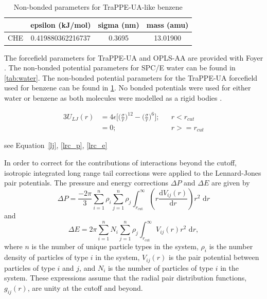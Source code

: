 \begin{table}
\caption{Non-bonded parameters for TraPPE-UA-like benzene} \label{tab:bz_nonbond}
\centering
\begin{tabular}{lccc}
    & epsilon (kJ/mol)  & sigma (nm) & mass (amu) \\ \hline
CHE & 0.419880362216737 & 0.3695     &  13.01900  \\
\end{tabular}
\end{table}

The forcefield parameters for TraPPE-UA and OPLS-AA are provided with Foyer \citep{foyer}. 
The non-bonded potential parameters for SPC/E water can be found in \autoref{tab:water}. 
The non-bonded potential parameters for the TraPPE-UA forcefield used for benzene can be found in \ref{tab:bz_nonbond}. No bonded potentials were used for either water or benzene as both molecules were modelled as a rigid bodies \citep{Nguyen2011a, Glaser2020a}. 


\begin{alignat}{3}
U_{LJ}(r) & = 4\epsilon\bigg[\bigg(\frac{\sigma}{r}\bigg)^{12} - \bigg(\frac{\sigma}{r}\bigg)^{6}\bigg]; && r<r_{cut} 
    \label{lj} \\
& = 0; && r>=r_{cut}
    \nonumber
\end{alignat}

see Equation~\eqref{lj}, \eqref{lrc_p}, \eqref{lrc_e}

In order to correct for the contributions of interactions beyond the cutoff, isotropic integrated long range tail corrections were applied to the Lennard-Jones pair potentials. The pressure and energy corrections $\Delta P$ and $\Delta E$ are given by
\begin{equation}\label{lrc_p}
    \Delta P = \frac{-2\pi}{3} \sum_{i=1}^{n} \rho_i \sum_{j=1}^{n} \rho_j
    \int_{r_\mathrm{cut}}^{\infty} \left( r
    \frac{\mathrm{d}V_{ij}(r)}{\mathrm{d}r} \right) r^2 \,\,\mathrm{d}r  
\end{equation}
and
\begin{equation}\label{lrc_e}
    \Delta E = 2\pi \sum_{i=1}^{n} N_i \sum_{j=1}^{n} \rho_j
    \int_{r_\mathrm{cut}}^{\infty} V_{ij}(r) r^2\,\,\mathrm{d}r, 
\end{equation}
where $n$ is the number of unique particle types in the system, $\rho_{i}$ is the number density of particles of type $i$ in the system, $V_{ij}(r)$ is the pair potential between particles of type $i$ and $j$, and $N_{i}$ is the number of particles of type $i$ in the system. These expressions assume that the radial pair distribution functions, $g_{ij}(r)$, are unity at the cutoff and beyond.

